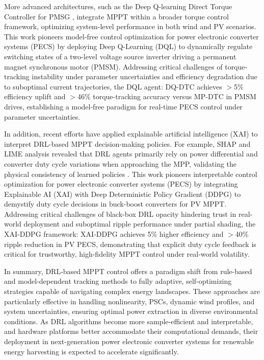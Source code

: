 More advanced architectures, such as the Deep Q-learning Direct Torque Controller for PMSG \cite{schenke2021deep}, integrate MPPT within a broader torque control framework, optimizing system-level performance in both wind and PV scenarios. This work pioneers model-free control optimization for power electronic converter systems (PECS) by deploying Deep Q-Learning (DQL) to dynamically regulate switching states of a two-level voltage source inverter driving a permanent magnet synchronous motor (PMSM). Addressing critical challenges of torque-tracking instability under parameter uncertainties and efficiency degradation due to suboptimal current trajectories, the DQL agent: DQ-DTC achieves $>$5\% efficiency uplift and $>$46\% torque-tracking accuracy versus MP-DTC in PMSM drives, establishing a model-free paradigm for real-time PECS control under parameter uncertainties.

In addition, recent efforts have applied explainable artificial intelligence (XAI) to interpret DRL-based MPPT decision-making policies. For example, SHAP and LIME analysis revealed that DRL agents primarily rely on power differential and converter duty cycle variations when approaching the MPP, validating the physical consistency of learned policies \cite{tan2022explainable}. This work pioneers interpretable control optimization for power electronic converter systems (PECS) by integrating Explainable AI (XAI) with Deep Deterministic Policy Gradient (DDPG) to demystify duty cycle decisions in buck-boost converters for PV MPPT. Addressing critical challenges of black-box DRL opacity hindering trust in real-world deployment and suboptimal ripple performance under partial shading, the XAI-DDPG framework: XAI-DDPG achieves 5\% higher efficiency and $>$40\% ripple reduction in PV PECS, demonstrating that explicit duty cycle feedback is critical for trustworthy, high-fidelity MPPT control under real-world volatility.

In summary, DRL-based MPPT control offers a paradigm shift from rule-based and model-dependent tracking methods to fully adaptive, self-optimizing strategies capable of navigating complex energy landscapes. These approaches are particularly effective in handling nonlinearity, PSCs, dynamic wind profiles, and system uncertainties, ensuring optimal power extraction in diverse environmental conditions. As DRL algorithms become more sample-efficient and interpretable, and hardware platforms better accommodate their computational demands, their deployment in next-generation power electronic converter systems for renewable energy harvesting is expected to accelerate significantly.

